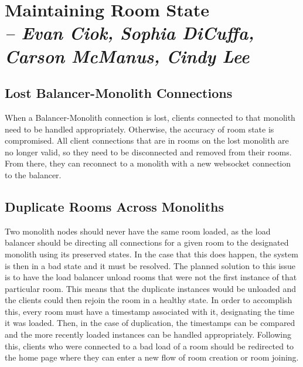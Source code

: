 \chapter{Maintaining Room State \\
  \small{\textit{-- Evan Ciok, Sophia DiCuffa, Carson McManus, Cindy Lee}}
  \label{Chapter::RoomState}}

\section{Lost Balancer-Monolith Connections}

When a Balancer-Monolith connection is lost, clients connected to that monolith need to be handled appropriately. Otherwise, the accuracy of room state is compromised.
All client connections that are in rooms on the lost monolith are no longer valid, so they need to be disconnected and removed
from their rooms. From there, they can reconnect to a monolith with a new websocket connection to the balancer.

\section{Duplicate Rooms Across Monoliths\label{Section::duplicate-rooms-across-monoliths}}

Two monolith nodes should never have the same room loaded, as the load balancer should be directing all connections for a given room to the designated monolith using its preserved states.
In the case that this does happen, the system is then in a bad state and it must be resolved. The planned solution to this issue is to have the load balancer unload rooms that were not the
first instance of that particular room. This means that the duplicate instances would be unloaded and the clients could then rejoin the room in a healthy state. In order to accomplish this,
every room must have a timestamp associated with it, designating the time it was loaded. Then, in the case of duplication, the timestamps can be compared and the more recently loaded
instances can be handled appropriately. Following this, clients who were connected to a bad load of a room should be redirected to the home page where they can enter a new flow of room
creation or room joining.


